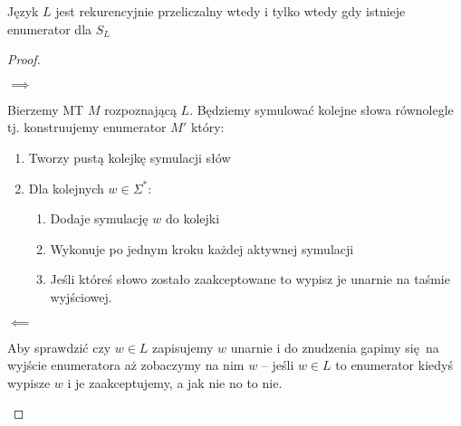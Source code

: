 \begin{theorem}
    Język \( L \) jest rekurencyjnie przeliczalny wtedy i tylko wtedy gdy istnieje enumerator dla \( S_L \)
\end{theorem}
\begin{proof}
    \begin{description}
        \item \( \implies \)
        
        Bierzemy MT \( M \) rozpoznającą \( L \).
        Będziemy symulować kolejne słowa równolegle tj. konstruujemy enumerator \( M' \) który:
        \begin{enumerate}
            \item Tworzy pustą kolejkę symulacji słów
            \item Dla kolejnych \( w \in \Sigma^* \):
            \begin{enumerate}
                \item Dodaje symulację \( w \) do kolejki
                \item Wykonuje po jednym kroku każdej aktywnej symulacji
                \item Jeśli któreś słowo zostało zaakceptowane to wypisz je unarnie na taśmie wyjściowej.
            \end{enumerate}
        \end{enumerate}
        
        \item \( \impliedby \)
        
        Aby sprawdzić czy \( w \in L \) zapisujemy \( w \) unarnie i do znudzenia gapimy się na wyjście enumeratora aż zobaczymy na nim \( w \) -- jeśli \( w \in L \) to enumerator kiedyś wypisze \( w \) i je zaakceptujemy, a jak nie no to nie.
        
    \end{description}
\end{proof}

